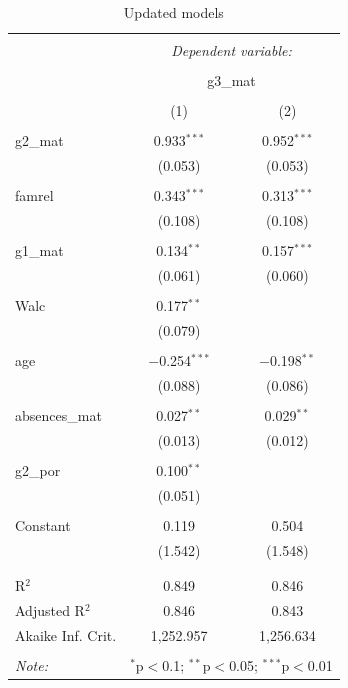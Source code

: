 \documentclass[a4paper,9pt,twocolumn,twoside,]{pinp}
\begin{document}
\begin{table}[!htbp] \centering 
  \caption{Updated models} 
  \label{tab:new-models} 
\tiny 
\begin{tabular}{@{\extracolsep{5pt}}lcc} 
\\[-1.8ex]\hline 
\hline \\[-1.8ex] 
 & \multicolumn{2}{c}{\textit{Dependent variable:}} \\ 
\cline{2-3} 
\\[-1.8ex] & \multicolumn{2}{c}{g3\_mat} \\ 
\\[-1.8ex] & (1) & (2)\\ 
\hline \\[-1.8ex] 
 g2\_mat & 0.933$^{***}$ & 0.952$^{***}$ \\ 
  & (0.053) & (0.053) \\ 
  & & \\ 
 famrel & 0.343$^{***}$ & 0.313$^{***}$ \\ 
  & (0.108) & (0.108) \\ 
  & & \\ 
 g1\_mat & 0.134$^{**}$ & 0.157$^{***}$ \\ 
  & (0.061) & (0.060) \\ 
  & & \\ 
 Walc & 0.177$^{**}$ &  \\ 
  & (0.079) &  \\ 
  & & \\ 
 age & $-$0.254$^{***}$ & $-$0.198$^{**}$ \\ 
  & (0.088) & (0.086) \\ 
  & & \\ 
 absences\_mat & 0.027$^{**}$ & 0.029$^{**}$ \\ 
  & (0.013) & (0.012) \\ 
  & & \\ 
 g2\_por & 0.100$^{**}$ &  \\ 
  & (0.051) &  \\ 
  & & \\ 
 Constant & 0.119 & 0.504 \\ 
  & (1.542) & (1.548) \\ 
  & & \\ 
\hline \\[-1.8ex] 
R$^{2}$ & 0.849 & 0.846 \\ 
Adjusted R$^{2}$ & 0.846 & 0.843 \\ 
Akaike Inf. Crit. & 1,252.957 & 1,256.634 \\ 
\hline 
\hline \\[-1.8ex] 
\textit{Note:}  & \multicolumn{2}{r}{$^{*}$p$<$0.1; $^{**}$p$<$0.05; $^{***}$p$<$0.01} \\ 
\end{tabular} 
\end{table}


\pnasbreak 
\end{document}
